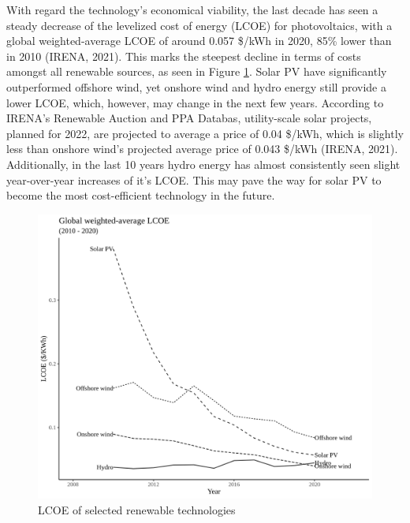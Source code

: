 \documentclass[11pt]{article}
\begin{document}
With regard the technology's economical viability, the last decade has seen a steady decrease of the levelized cost of energy (LCOE) for photovoltaics, with a global weighted-average LCOE of around 0.057 \$/kWh in 2020, 85\% lower than in 2010 (IRENA, 2021). This marks the steepest decline in terms of costs amongst all renewable sources, as seen in Figure \ref{fig:lcoe}. Solar PV have significantly outperformed offshore wind, yet onshore wind and hydro energy still provide a lower LCOE, which, however, may change in the next few years. According to IRENA's Renewable Auction and PPA Databas, utility-scale solar projects, planned for 2022, are projected to average a price of 0.04 \$/kWh, which is slightly less than onshore wind's projected average price of 0.043 \$/kWh (IRENA, 2021). Additionally, in the last 10 years hydro energy has almost consistently seen slight year-over-year increases of it's LCOE. This may pave the way for solar PV to become the most cost-efficient technology in the future.
\newline


\begin{figure}[h]
    \centering
    \includegraphics[width=\textwidth]{Figures/LCOE.png}
    \caption{LCOE of selected renewable technologies}
    \label{fig:lcoe}
\end{figure}
\end{document}
